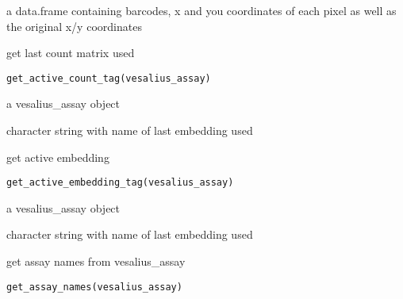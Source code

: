 \documentclass[a4paper]{book}
\begin{document}
%
\begin{Value}
a data.frame containing barcodes, x and you coordinates
of each pixel as well as the original x/y coordinates
\end{Value}
%
\begin{Description}
get last count matrix used
\end{Description}
%
\begin{Usage}
\begin{verbatim}
get_active_count_tag(vesalius_assay)
\end{verbatim}
\end{Usage}
%
\begin{Arguments}
\begin{ldescription}
\item[\code{vesalius\_assay}] a vesalius\_assay object
\end{ldescription}
\end{Arguments}
%
\begin{Value}
character string with name of last embedding used
\end{Value}
%
\begin{Description}
get active embedding
\end{Description}
%
\begin{Usage}
\begin{verbatim}
get_active_embedding_tag(vesalius_assay)
\end{verbatim}
\end{Usage}
%
\begin{Arguments}
\begin{ldescription}
\item[\code{vesalius\_assay}] a vesalius\_assay object
\end{ldescription}
\end{Arguments}
%
\begin{Value}
character string with name of last embedding used
\end{Value}
%
\begin{Description}
get assay names from vesalius\_assay
\end{Description}
%
\begin{Usage}
\begin{verbatim}
get_assay_names(vesalius_assay)
\end{verbatim}
\end{Usage}
\end{document}

